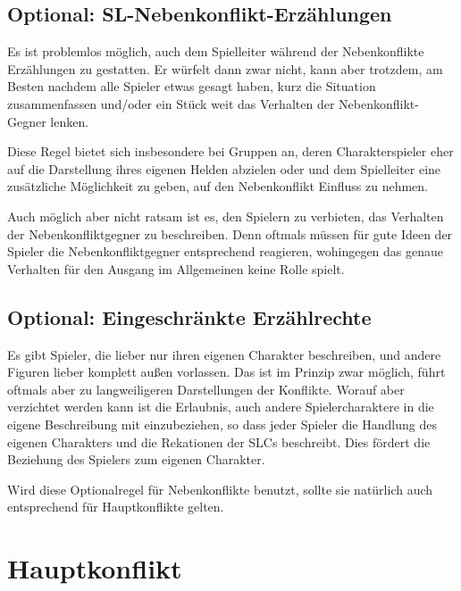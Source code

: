 \begin{optional}
\section{Optional: SL-Nebenkonflikt-Erzählungen}
Es ist problemlos möglich, auch dem Spielleiter während der Nebenkonflikte Erzählungen zu gestatten. Er würfelt dann zwar nicht, kann aber trotzdem, am Besten nachdem alle Spieler etwas gesagt haben, kurz die Situation zusammenfassen und/oder ein Stück weit das Verhalten der Nebenkonflikt-Gegner lenken.

Diese Regel bietet sich insbesondere bei Gruppen an, deren Charakterspieler eher auf die Darstellung ihres eigenen Helden abzielen oder und dem Spielleiter eine zusätzliche Möglichkeit zu geben, auf den Nebenkonflikt Einfluss zu nehmen.

Auch möglich aber nicht ratsam ist es, den Spielern zu verbieten, das Verhalten der Nebenkonfliktgegner zu beschreiben. Denn oftmals müssen für gute Ideen der Spieler die Nebenkonfliktgegner entsprechend reagieren, wohingegen das genaue Verhalten für den Ausgang im Allgemeinen keine Rolle spielt.
\end{optional}


\begin{optional}
\section{Optional: Eingeschränkte Erzählrechte}

Es gibt Spieler, die lieber nur ihren eigenen Charakter beschreiben, und andere Figuren lieber komplett außen vorlassen. Das ist im Prinzip zwar möglich, führt oftmals aber zu langweiligeren Darstellungen der Konflikte. Worauf aber verzichtet werden kann ist die Erlaubnis, auch andere Spielercharaktere in die eigene Beschreibung mit einzubeziehen, so dass jeder Spieler die Handlung des eigenen Charakters und die Rekationen der SLCs beschreibt. Dies fördert die Beziehung des Spielers zum eigenen Charakter.

Wird diese Optionalregel für Nebenkonflikte benutzt, sollte sie natürlich auch entsprechend für Hauptkonflikte gelten.
\end{optional}





\section{Hauptkonflikt}\label{Sec:Hauptkonflikt}
